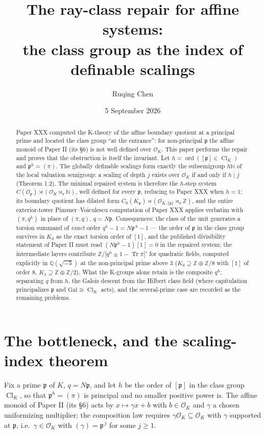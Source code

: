 \documentclass[11pt]{amsart}
\title[The ray-class repair for affine systems]{The ray-class repair for affine systems:\\ the class group as the index of definable scalings}
\author{Ruqing Chen}
\date{5 September 2026}
\theoremstyle{remark}
\newcommand{\OK}{\mathcal{O}_K}
\newcommand{\Op}{\mathcal{O}_\pp}
\newcommand{\pp}{\mathfrak{p}}
\newcommand{\Z}{\mathbb{Z}}
\newcommand{\N}{\mathbb{N}}
\newcommand{\Q}{\mathbb{Q}}
\newcommand{\Ns}{N}
\newcommand{\Tr}{\operatorname{Tr}}
\newcommand{\Cl}{\operatorname{Cl}}
\newcommand{\ord}{\operatorname{ord}}
\begin{document}
\begin{abstract}
Paper XXX computed the K-theory of the affine boundary quotient at a principal prime and
located the class group ``at the entrance'': for non-principal $\pp$ the affine monoid of
Paper II (its \S6) is not well defined over $\OK$. This paper performs the repair and
proves that the obstruction is itself the invariant. Let $h=\ord([\pp]\in\Cl_K)$ and
$\pp^h=(\pi)$. The globally definable scalings form exactly the subsemigroup
$h\N$ of the local valuation semigroup: a scaling of depth $j$ exists over $\OK$ if and
only if $h\mid j$ (Theorem 1.2). The minimal repaired system is therefore the $h$-step
system $C(\Op)\rtimes(\OK\rtimes_\pi\N)$, well defined for every $\pp$, reducing to Paper
XXX when $h=1$; its boundary quotient has dilated form
$C_0(K_\pp)\rtimes(\mathcal O_{K,\{\pp\}}\rtimes_\pi\Z)$, and the entire exterior-tower
Pimsner--Voiculescu computation of Paper XXX applies verbatim with $(\pi,q^h)$ in place of
$(\pi,q)$, $q=\Ns\pp$. Consequences: the class of the unit generates a torsion summand of
\emph{exact} order $q^h-1=\Ns\pp^{\,h}-1$ --- the order of $\pp$ in the class group
survives in $K_0$ as the exact torsion order of $[1]$, and the published divisibility
statement of Paper II must read $(\Ns\pp^{h}-1)[1]=0$ in the repaired system; the
intermediate layers contribute $\Z/|q^h\pm1-\Tr\pi|'$ for quadratic fields, computed
explicitly in $\Q(\sqrt{-5})$ at the non-principal prime above $3$ ($K_0\supseteq
\Z\oplus\Z/8$ with $[1]$ of order $8$, $K_1\supseteq\Z\oplus\Z/2$). What the K-groups
alone retain is the composite $q^h$; separating $q$ from $h$, the Galois descent from the
Hilbert class field (where capitulation principalizes $\pp$ and $\mathrm{Gal}\cong\Cl_K$
acts), and the several-prime case are recorded as the remaining problems.
\end{abstract}

\maketitle

\section{The bottleneck, and the scaling-index theorem}\label{sec:index}

Fix a prime $\pp$ of $K$, $q=\Ns\pp$, and let $h$ be the order of $[\pp]$ in the class
group $\Cl_K$, so that $\pp^h=(\pi)$ is principal and no smaller positive power is. The
affine monoid of Paper II (its \S6) acts by $x\mapsto\gamma x+b$ with $b\in\OK$ and
$\gamma$ a chosen uniformizing multiplier; the composition law requires $\gamma\OK\subseteq
\OK$ with $\gamma$ supported at $\pp$, i.e.\ $\gamma\in\OK$ with $(\gamma)=\pp^{\,j}$ for
some $j\ge1$.
\end{document}
